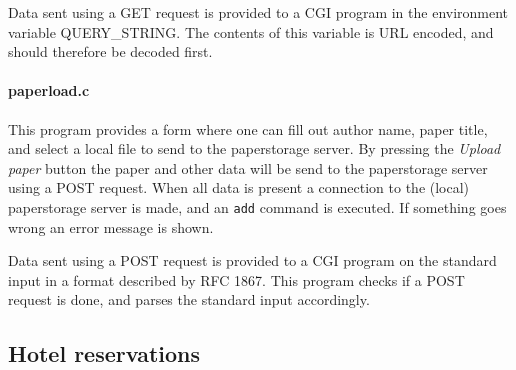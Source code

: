 \documentclass[a4paper,10pt]{article}
\begin{document}
Data sent using a \textsc{GET} request is provided to a CGI program in the environment
variable \textsc{QUERY_STRING}. The contents of this variable is URL encoded, and should
therefore be decoded first.

\paragraph{paperload.c}
This program provides a form where one can fill out author name, paper title, and
select a local file to send to the paperstorage server. By pressing the
\textit{Upload paper} button the paper and other data will be send to the paperstorage
server using a \textsc{POST} request. When all data is present a connection to the
(local) paperstorage server is made, and an \texttt{add} command is executed. If
something goes wrong an error message is shown.

Data sent using a \textsc{POST} request is provided to a CGI program on the standard
input in a format described by RFC 1867. This program checks if a \textsc{POST} request
is done, and parses the standard input accordingly.

\subsection{Hotel reservations}
\end{document}
